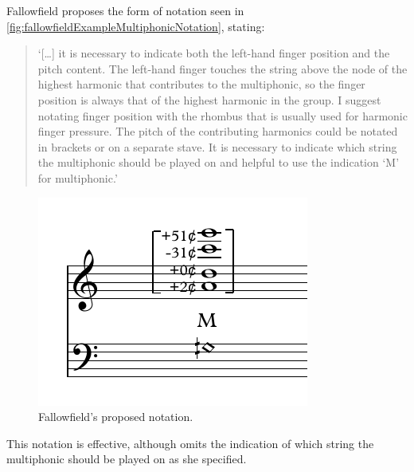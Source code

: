 Fallowfield proposes the form of notation seen in \autoref{fig:fallowfieldExampleMultiphonicNotation}, stating:
\begin{quotation}
  `[\ldots] it is necessary to indicate both the left-hand finger position and the pitch content. 
  The left-hand finger touches the string above the node of the highest harmonic that contributes to the multiphonic, so the finger position is always that of the highest harmonic in the group. 
  I suggest notating finger position with the rhombus that is usually used for harmonic finger pressure. 
  The pitch of the contributing harmonics could be notated in brackets or on a separate stave. 
  It is necessary to indicate which string the multiphonic should be played on and helpful to use the indication ‘M’ for multiphonic.'\autocite[http://www.cellomap.com/index/the-string/multiphonics-and-other-multiple-sounds.html]{fallowfieldCelloMap}
\end{quotation}

\begin{figure}
  \centering
      \includegraphics{./resources/fallowfieldExampleMultiphonicNotation.pdf}
      \caption{Fallowfield's proposed notation.}\label{fig:fallowfieldExampleMultiphonicNotation}\end{figure}

This notation is effective, although omits the indication of which string the multiphonic should be played on as she specified.



